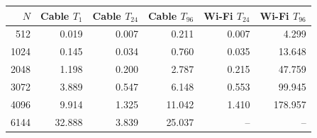 \begin{center}
\small
\begin{tabular}{rrrrrr}
\toprule
$N$ & Cable $T_1$ & Cable $T_{24}$ & Cable $T_{96}$ & Wi-Fi $T_{24}$ & Wi-Fi $T_{96}$ \\
\midrule
512 & 0.019 & 0.007 & 0.211 & 0.007 & 4.299 \\
1024 & 0.145 & 0.034 & 0.760 & 0.035 & 13.648 \\
2048 & 1.198 & 0.200 & 2.787 & 0.215 & 47.759 \\
3072 & 3.889 & 0.547 & 6.148 & 0.553 & 99.945 \\
4096 & 9.914 & 1.325 & 11.042 & 1.410 & 178.957 \\
6144 & 32.888 & 3.839 & 25.037 & -- & -- \\
\bottomrule
\end{tabular}
\end{center}
